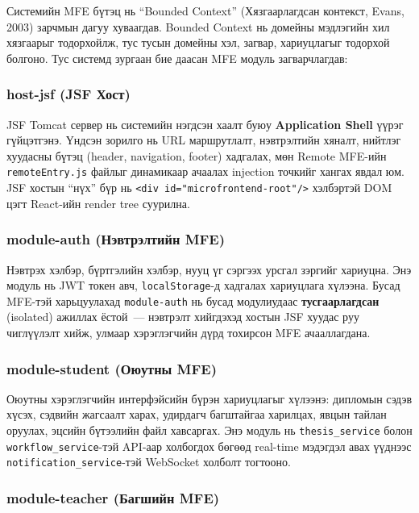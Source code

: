 Системийн MFE бүтэц нь ``Bounded Context'' (Хязгаарлагдсан контекст,
Evans, 2003) зарчмын дагуу хуваагдав. Bounded Context нь домейны
мэдлэгийн хил хязгаарыг тодорхойлж, тус тусын домейны хэл, загвар,
хариуцлагыг тодорхой болгоно. Тус системд зургаан бие даасан MFE
модуль загварчлагдав:

\subsubsection{host-jsf (JSF Хост)}

JSF Tomcat сервер нь системийн нэгдсэн хаалт буюу \textbf{Application
Shell} үүрэг гүйцэтгэнэ. Үндсэн зорилго нь URL маршрутлалт, нэвтрэлтийн
хяналт, нийтлэг хуудасны бүтэц (header, navigation, footer) хадгалах,
мөн Remote MFE-ийн \texttt{remoteEntry.js} файлыг динамикаар ачаалах
injection точкийг хангах явдал юм. JSF хостын ``нүх'' бүр нь
\texttt{<div id=\texttt{"}microfrontend-root\texttt{"}/>} хэлбэртэй
DOM цэгт React-ийн render tree суурилна.

\subsubsection{module-auth (Нэвтрэлтийн MFE)}

Нэвтрэх хэлбэр, бүртгэлийн хэлбэр, нууц үг сэргээх урсгал зэргийг
хариуцна. Энэ модуль нь JWT токен авч, \texttt{localStorage}-д хадгалах
хариуцлага хүлээна. Бусад MFE-тэй харьцуулахад \texttt{module-auth} нь
бусад модулиудаас \textbf{тусгаарлагдсан} (isolated) ажиллах ёстой~---
нэвтрэлт хийгдэхэд хостын JSF хуудас руу чиглүүлэлт хийж, улмаар
хэрэглэгчийн дүрд тохирсон MFE ачааллагдана.

\subsubsection{module-student (Оюутны MFE)}

Оюутны хэрэглэгчийн интерфэйсийн бүрэн хариуцлагыг хүлээнэ: дипломын
сэдэв хүсэх, сэдвийн жагсаалт харах, удирдагч багштайгаа харилцах,
явцын тайлан оруулах, эцсийн бүтээлийн файл хавсаргах. Энэ модуль нь
\texttt{thesis\_service} болон \texttt{workflow\_service}-тэй API-аар
холбогдох бөгөөд real-time мэдэгдэл авах үүднээс
\texttt{notification\_service}-тэй WebSocket холболт тогтооно.

\subsubsection{module-teacher (Багшийн MFE)}

